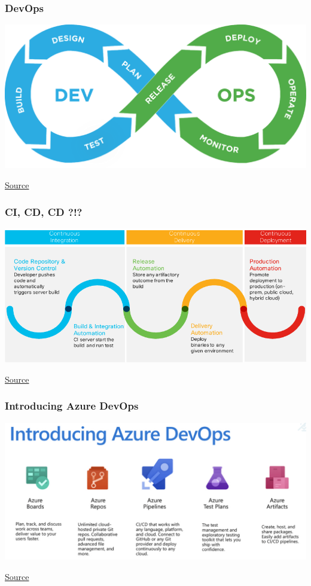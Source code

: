 \documentclass{beamer}
\newcommand{\source}[1]{
	\begin{flushright}
		\hfill {\scriptsize \href{#1}{Source}}	
	\end{flushright}
}
\begin{document}
\begin{frame}
\frametitle{DevOps}

\includegraphics[width=\textwidth]{devopsloop.png}
\source{https://cyara.com/platform/platform-infinity-loop/}	

\end{frame}

\begin{frame}
\frametitle{CI, CD, CD ?!?}

\includegraphics[width=\textwidth]{cicd.png} \\
\source{https://blogs.cisco.com/cloud/have-you-ever-considered-ci-cd-as-a-service}

\end{frame}

\begin{frame}
\frametitle{Introducing Azure DevOps}

\includegraphics[width=\textwidth]{introducing-azure-devops.png}
\source{https://www.telerik.com/blogs/microsoft-azure-devops-what-you-need-to-know}
	

\end{frame}
\end{document}
